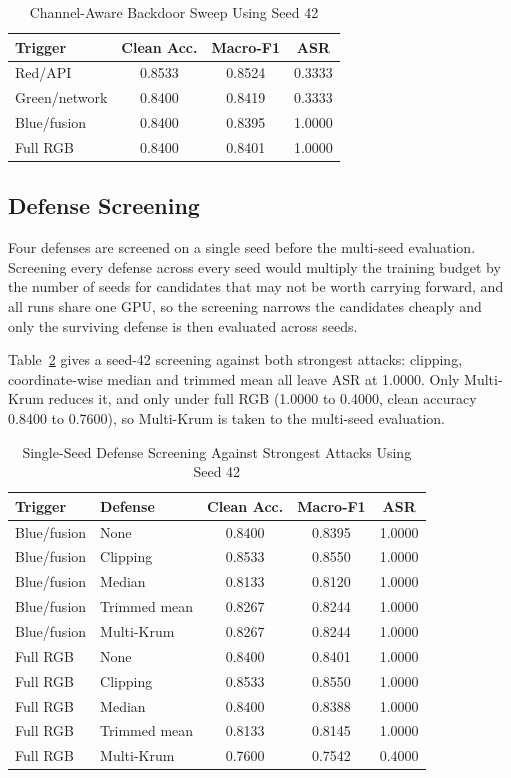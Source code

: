 \documentclass[conference]{IEEEtran}
\begin{document}
\begin{table}[h]
\caption{Channel-Aware Backdoor Sweep Using Seed 42}
\label{tab:sweep}
\centering
\footnotesize
\begin{tabular}{lccc}
\toprule
\textbf{Trigger} & \textbf{Clean Acc.} & \textbf{Macro-F1} & \textbf{ASR} \\
\midrule
Red/API & 0.8533 & 0.8524 & 0.3333 \\
Green/network & 0.8400 & 0.8419 & 0.3333 \\
Blue/fusion & 0.8400 & 0.8395 & 1.0000 \\
Full RGB & 0.8400 & 0.8401 & 1.0000\\
\bottomrule
\end{tabular}
\end{table}

\subsection{Defense Screening}

Four defenses are screened on a single seed before the multi-seed evaluation. Screening every defense across every seed would multiply the training budget by the number of seeds for candidates that may not be worth carrying forward, and all runs share one GPU, so the screening narrows the candidates cheaply and only the surviving defense is then evaluated across seeds.

Table~\ref{tab:defense_screening} gives a seed-42 screening against both strongest attacks: clipping, coordinate-wise median and trimmed mean all leave ASR at 1.0000. Only Multi-Krum reduces it, and only under full RGB (1.0000 to 0.4000, clean accuracy 0.8400 to 0.7600), so Multi-Krum is taken to the multi-seed evaluation.

\begin{table}[h]
	\caption{Single-Seed Defense Screening Against Strongest Attacks Using Seed 42}
	\label{tab:defense_screening}
	\centering
	\footnotesize
	\setlength{\tabcolsep}{5pt}
	\begin{tabular}{llccc}
		\toprule
		\textbf{Trigger} & \textbf{Defense} & \textbf{Clean Acc.} & \textbf{Macro-F1} & \textbf{ASR} \\
		\midrule
		Blue/fusion & None & 0.8400 & 0.8395 & 1.0000 \\
		Blue/fusion & Clipping & 0.8533 & 0.8550 & 1.0000 \\
		Blue/fusion & Median & 0.8133 & 0.8120 & 1.0000 \\
		Blue/fusion & Trimmed mean & 0.8267 & 0.8244 & 1.0000 \\
		Blue/fusion & Multi-Krum & 0.8267 & 0.8244 & 1.0000 \\
		\midrule
		Full RGB & None & 0.8400 & 0.8401 & 1.0000 \\
		Full RGB & Clipping & 0.8533 & 0.8550 & 1.0000 \\
		Full RGB & Median & 0.8400 & 0.8388 & 1.0000 \\
		Full RGB & Trimmed mean & 0.8133 & 0.8145 & 1.0000 \\
		Full RGB & Multi-Krum & 0.7600 & 0.7542 & 0.4000 \\
		\bottomrule
	\end{tabular}
\end{table}
\end{document}
